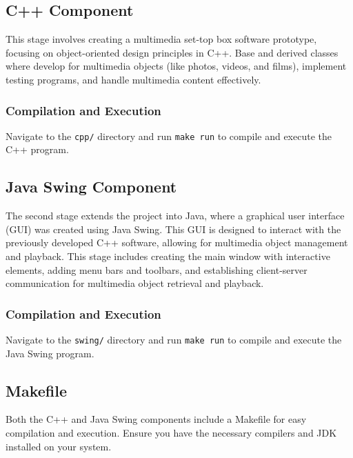 \documentclass[
]{article}
\begin{document}
\subsection{C++ Component}\label{c-component}

This stage involves creating a multimedia set-top box software
prototype, focusing on object-oriented design principles in C++. Base
and derived classes where develop for multimedia objects (like photos,
videos, and films), implement testing programs, and handle multimedia
content effectively.

\subsubsection{Compilation and
Execution}\label{compilation-and-execution}

Navigate to the \texttt{cpp/} directory and run \texttt{make\ run} to
compile and execute the C++ program.

\subsection{Java Swing Component}\label{java-swing-component}

The second stage extends the project into Java, where a graphical user
interface (GUI) was created using Java Swing. This GUI is designed to
interact with the previously developed C++ software, allowing for
multimedia object management and playback. This stage includes creating
the main window with interactive elements, adding menu bars and
toolbars, and establishing client-server communication for multimedia
object retrieval and playback.

\subsubsection{Compilation and
Execution}\label{compilation-and-execution-1}

Navigate to the \texttt{swing/} directory and run \texttt{make\ run} to
compile and execute the Java Swing program.

\subsection{Makefile}\label{makefile}

Both the C++ and Java Swing components include a Makefile for easy
compilation and execution. Ensure you have the necessary compilers and
JDK installed on your system.
\end{document}
